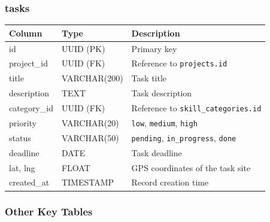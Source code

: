 \documentclass[12pt,a4paper]{article}
\begin{document}
\subsubsection{tasks}

\begin{tabularx}{\textwidth}{llX}
\toprule
\textbf{Column} & \textbf{Type} & \textbf{Description} \\
\midrule
id           & UUID (PK)    & Primary key \\
project\_id  & UUID (FK)    & Reference to \texttt{projects.id} \\
title        & VARCHAR(200) & Task title \\
description  & TEXT         & Task description \\
category\_id & UUID (FK)    & Reference to \texttt{skill\_categories.id} \\
priority     & VARCHAR(20)  & \texttt{low}, \texttt{medium}, \texttt{high} \\
status       & VARCHAR(50)  & \texttt{pending}, \texttt{in\_progress}, \texttt{done} \\
deadline     & DATE         & Task deadline \\
lat, lng     & FLOAT        & GPS coordinates of the task site \\
created\_at  & TIMESTAMP    & Record creation time \\
\bottomrule
\end{tabularx}

\subsubsection{Other Key Tables}
\end{document}

